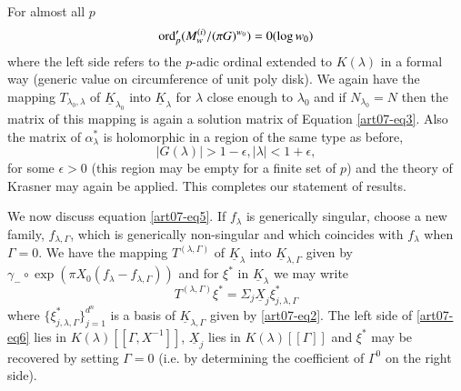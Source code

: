 For almost all $p$
\begin{equation}
\operatorname{\mathrm{ord}}'_{p}(M^{(i)}_{w}/(\pi G)^{w_{0}})=0(\log w_{0})\label{art07-eq6}
\end{equation}
where the left side refers to the $p$-adic ordinal extended to $K(\lambda)$ in a formal way (generic value on circumference of unit poly disk). We again have the mapping $T_{\lambda_{0},\lambda}$ of $\underline{K}_{\lambda_{0}}$ into $\underline{K}_{\lambda}$ for $\lambda$ close enough to $\lambda_{0}$ and if $N_{\lambda_{0}}=N$ then the matrix of this mapping is again a solution matrix of Equation \eqref{art07-eq3}. Also the matrix of $\alpha^{*}_{\lambda}$ is holomorphic in a region of the same type as before,
$$
|G(\lambda)|>1-\epsilon, |\lambda|<1+\epsilon,
$$
for some $\epsilon>0$ (this region may be empty for a finite set of $p$) and the theory of Krasner may again be applied. This completes our statement of results.

We now discuss equation \eqref{art07-eq5}. If $f_{\lambda}$ is generically singular, choose a new family, $f_{\lambda,\Gamma}$, which is generically non-singular and which coincides with $f_{\lambda}$ when $\Gamma=0$. We have the mapping $T^{(\lambda,\Gamma)}$ of $\underline{K}_{\lambda}$ into $\underline{K}_{\lambda,\Gamma}$ given by $\gamma_{-}\circ \exp (\pi X_{0}(f_{\lambda}-f_{\lambda,\Gamma}))$ and for $\xi^{*}$ in $\underline{K}_{\lambda}$ we may write
\begin{equation}
T^{(\lambda,\Gamma)}\xi^{*}=\Sigma_{j}\underline{X}_{j}\xi^{*}_{j,\lambda,\Gamma}\label{art07-eq7}
\end{equation}
where $\{\xi^{*}_{j,\lambda,\Gamma}\}^{d^{n}}_{j=1}$ is a basis of $\underline{K}_{\lambda,\Gamma}$ given by \eqref{art07-eq2}. The left side of \eqref{art07-eq6} lies in $K(\lambda)[[\Gamma,X^{-1}]]$, $\underline{X}_{j}$ lies in $K(\lambda)[[\Gamma]]$ and $\xi^{*}$ may be recovered by setting $\Gamma=0$ (i.e. by determining the coefficient of $\Gamma^{0}$ on the right side).

